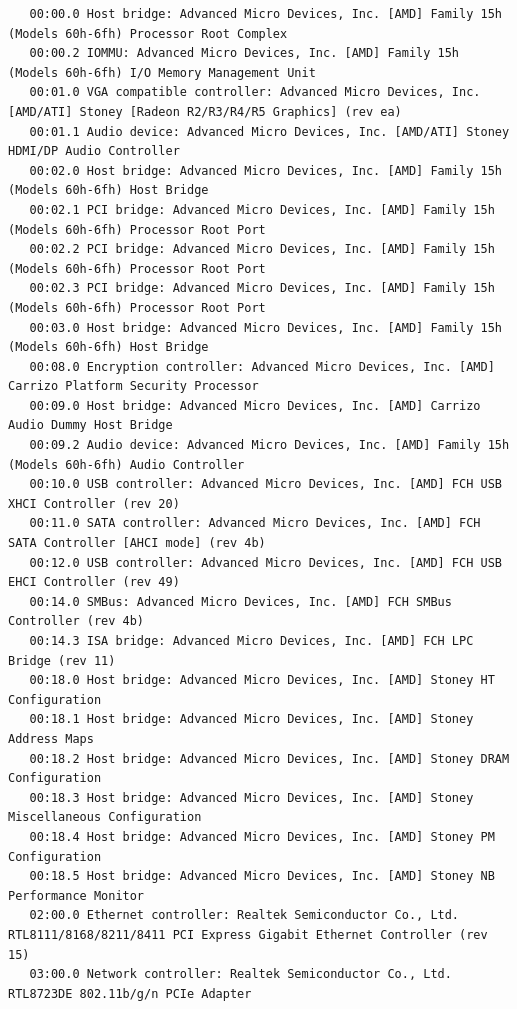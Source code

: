 \documentclass{article}
\begin{document}
\label{org6dd9d7d}
\begin{verbatim}
   00:00.0 Host bridge: Advanced Micro Devices, Inc. [AMD] Family 15h (Models 60h-6fh) Processor Root Complex
   00:00.2 IOMMU: Advanced Micro Devices, Inc. [AMD] Family 15h (Models 60h-6fh) I/O Memory Management Unit
   00:01.0 VGA compatible controller: Advanced Micro Devices, Inc. [AMD/ATI] Stoney [Radeon R2/R3/R4/R5 Graphics] (rev ea)
   00:01.1 Audio device: Advanced Micro Devices, Inc. [AMD/ATI] Stoney HDMI/DP Audio Controller
   00:02.0 Host bridge: Advanced Micro Devices, Inc. [AMD] Family 15h (Models 60h-6fh) Host Bridge
   00:02.1 PCI bridge: Advanced Micro Devices, Inc. [AMD] Family 15h (Models 60h-6fh) Processor Root Port
   00:02.2 PCI bridge: Advanced Micro Devices, Inc. [AMD] Family 15h (Models 60h-6fh) Processor Root Port
   00:02.3 PCI bridge: Advanced Micro Devices, Inc. [AMD] Family 15h (Models 60h-6fh) Processor Root Port
   00:03.0 Host bridge: Advanced Micro Devices, Inc. [AMD] Family 15h (Models 60h-6fh) Host Bridge
   00:08.0 Encryption controller: Advanced Micro Devices, Inc. [AMD] Carrizo Platform Security Processor
   00:09.0 Host bridge: Advanced Micro Devices, Inc. [AMD] Carrizo Audio Dummy Host Bridge
   00:09.2 Audio device: Advanced Micro Devices, Inc. [AMD] Family 15h (Models 60h-6fh) Audio Controller
   00:10.0 USB controller: Advanced Micro Devices, Inc. [AMD] FCH USB XHCI Controller (rev 20)
   00:11.0 SATA controller: Advanced Micro Devices, Inc. [AMD] FCH SATA Controller [AHCI mode] (rev 4b)
   00:12.0 USB controller: Advanced Micro Devices, Inc. [AMD] FCH USB EHCI Controller (rev 49)
   00:14.0 SMBus: Advanced Micro Devices, Inc. [AMD] FCH SMBus Controller (rev 4b)
   00:14.3 ISA bridge: Advanced Micro Devices, Inc. [AMD] FCH LPC Bridge (rev 11)
   00:18.0 Host bridge: Advanced Micro Devices, Inc. [AMD] Stoney HT Configuration
   00:18.1 Host bridge: Advanced Micro Devices, Inc. [AMD] Stoney Address Maps
   00:18.2 Host bridge: Advanced Micro Devices, Inc. [AMD] Stoney DRAM Configuration
   00:18.3 Host bridge: Advanced Micro Devices, Inc. [AMD] Stoney Miscellaneous Configuration
   00:18.4 Host bridge: Advanced Micro Devices, Inc. [AMD] Stoney PM Configuration
   00:18.5 Host bridge: Advanced Micro Devices, Inc. [AMD] Stoney NB Performance Monitor
   02:00.0 Ethernet controller: Realtek Semiconductor Co., Ltd. RTL8111/8168/8211/8411 PCI Express Gigabit Ethernet Controller (rev 15)
   03:00.0 Network controller: Realtek Semiconductor Co., Ltd. RTL8723DE 802.11b/g/n PCIe Adapter
\end{verbatim}
\end{document}

